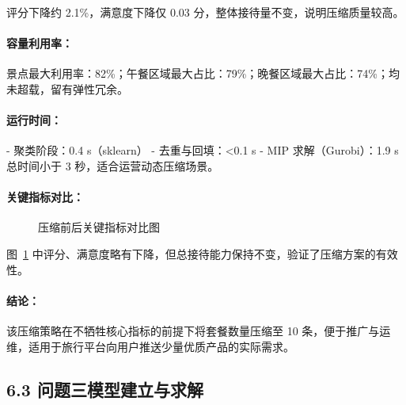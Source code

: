 \documentclass[12pt,a4paper]{article}
\begin{document}
评分下降约 2.1\%，满意度下降仅 0.03 分，整体接待量不变，说明压缩质量较高。

\paragraph{容量利用率：}
景点最大利用率：82\%；午餐区域最大占比：79\%；晚餐区域最大占比：74\%；均未超载，留有弹性冗余。

\paragraph{运行时间：}
- 聚类阶段：0.4 s（sklearn）
- 去重与回填：<0.1 s
- MIP 求解（Gurobi）：1.9 s  
总时间小于 3 秒，适合运营动态压缩场景。

\paragraph{关键指标对比：}
\begin{figure}[H]
  \centering
  \caption{压缩前后关键指标对比图}\label{fig:p2_bar}
\end{figure}

图~\ref{fig:p2_bar} 中评分、满意度略有下降，但总接待能力保持不变，验证了压缩方案的有效性。

\paragraph{结论：}
该压缩策略在不牺牲核心指标的前提下将套餐数量压缩至 10 条，便于推广与运维，适用于旅行平台向用户推送少量优质产品的实际需求。

\subsection*{6.3 问题三模型建立与求解}
\end{document}

